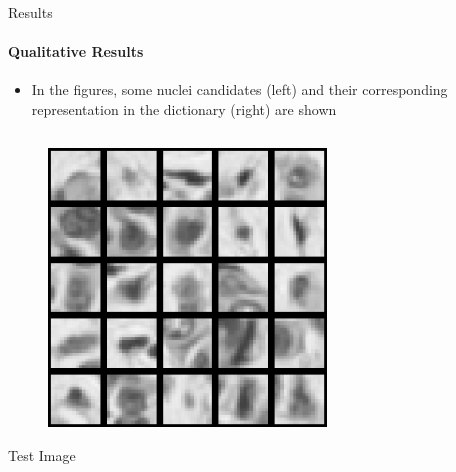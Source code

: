 \documentclass[usenames,dvipsnames]{beamer}
\begin{document}
\begin{frame}{Results}
\framesubtitle{Qualitative Results}
\begin{itemize}
\item In the figures, some nuclei candidates (left) and their corresponding representation in the dictionary (right) are shown
\end{itemize}
\vspace{-0.8cm}
\begin{columns}[t, totalwidth=1\textwidth]
\begin{column}{0.5\textwidth}
\begin{center}
\begin{figure}
\includegraphics[width=0.9\textwidth]{imagenes/nuclei_test.png}
\end{figure}
\centering\small Test Image
\end{center}
\end{column}
\begin{column}{0.5\textwidth}         %
\begin{center}
\begin{figure}

\end{figure}
\end{center}
\end{column}
\end{columns}
\end{frame}
\end{document}
